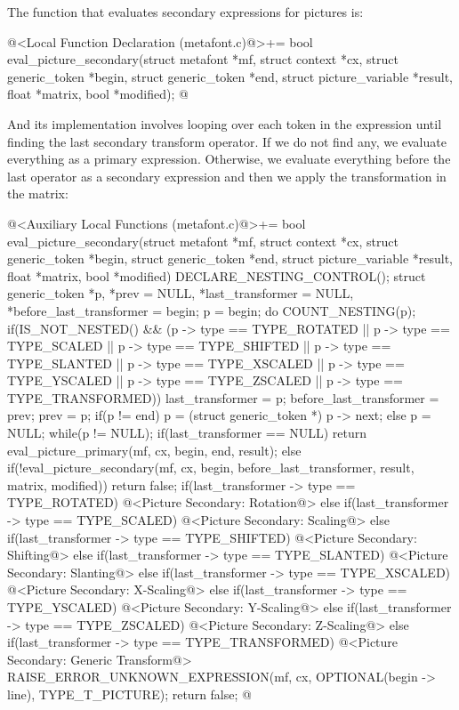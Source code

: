 {{{{{The function that evaluates secondary expressions for pictures is:

\iniciocodigo
@<Local Function Declaration (metafont.c)@>+=
bool eval_picture_secondary(struct metafont *mf, struct context *cx,
                            struct generic_token *begin,
                            struct generic_token *end,
                            struct picture_variable *result,
                            float *matrix, bool *modified);
@
\fimcodigo

And its implementation involves looping over each token in the
expression until finding the last secondary transform operator. If we
do not find any, we evaluate everything as a primary
expression. Otherwise, we evaluate everything before the last operator
as a secondary expression and then we apply the transformation in the
matrix:

\iniciocodigo
@<Auxiliary Local Functions (metafont.c)@>+=
bool eval_picture_secondary(struct metafont *mf, struct context *cx,
                            struct generic_token *begin,
                            struct generic_token *end,
                            struct picture_variable *result,
                            float *matrix, bool *modified){
  DECLARE_NESTING_CONTROL();
  struct generic_token *p, *prev = NULL, *last_transformer = NULL,
                       *before_last_transformer = begin;
  p = begin;
  do{
    COUNT_NESTING(p);
    if(IS_NOT_NESTED() && (p -> type == TYPE_ROTATED ||
       p -> type == TYPE_SCALED || p -> type == TYPE_SHIFTED ||
       p -> type == TYPE_SLANTED || p -> type == TYPE_XSCALED ||
       p -> type == TYPE_YSCALED || p -> type == TYPE_ZSCALED ||
       p -> type == TYPE_TRANSFORMED)){
      last_transformer = p;
      before_last_transformer = prev;
    }
    prev = p;
    if(p != end)
      p = (struct generic_token *) p -> next;
    else
      p = NULL;
  }while(p != NULL);
  if(last_transformer == NULL)
    return eval_picture_primary(mf, cx, begin, end, result);
  else{
    if(!eval_picture_secondary(mf, cx, begin, before_last_transformer, result,
                               matrix, modified))
      return false;
    if(last_transformer -> type == TYPE_ROTATED){
      @<Picture Secondary: Rotation@>
    }
    else if(last_transformer -> type == TYPE_SCALED){
      @<Picture Secondary: Scaling@>
    }
    else if(last_transformer -> type == TYPE_SHIFTED){
      @<Picture Secondary: Shifting@>
    }
    else if(last_transformer -> type == TYPE_SLANTED){
      @<Picture Secondary: Slanting@>
    }
    else if(last_transformer -> type == TYPE_XSCALED){
      @<Picture Secondary: X-Scaling@>
    }
    else if(last_transformer -> type == TYPE_YSCALED){
      @<Picture Secondary: Y-Scaling@>
    }
    else if(last_transformer -> type == TYPE_ZSCALED){
      @<Picture Secondary: Z-Scaling@>
    }
    else if(last_transformer -> type == TYPE_TRANSFORMED){
      @<Picture Secondary: Generic Transform@>
    }
    RAISE_ERROR_UNKNOWN_EXPRESSION(mf, cx, OPTIONAL(begin -> line),
                                   TYPE_T_PICTURE);
    return false;
  }
}
@
\fimcodigo

}}}}}
